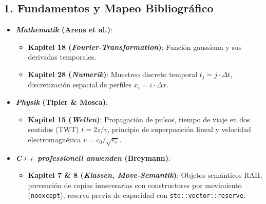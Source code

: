\documentclass[11pt,a4paper]{article}
\begin{document}
\subsection{1. Fundamentos y Mapeo Bibliográfico}
\begin{itemize}
    \item \textbf{\textit{Mathematik} (Arens et al.)}:
    \begin{itemize}
        \item \textbf{Kapitel 18 (\textit{Fourier-Transformation})}: Función gaussiana y sus derivadas temporales.
        \item \textbf{Kapitel 28 (\textit{Numerik})}: Muestreo discreto temporal $t_j = j \cdot \Delta t$, discretización espacial de perfiles $x_i = i \cdot \Delta x$.
    \end{itemize}
    \item \textbf{\textit{Physik} (Tipler \& Mosca)}:
    \begin{itemize}
        \item \textbf{Kapitel 15 (\textit{Wellen})}: Propagación de pulsos, tiempo de viaje en dos sentidos (TWT) $t = 2z/v$, principio de superposición lineal y velocidad electromagnética $v = c_0 / \sqrt{\varepsilon_r}$.
    \end{itemize}
    \item \textbf{\textit{C++ professionell anwenden} (Breymann)}:
    \begin{itemize}
        \item \textbf{Kapitel 7 \& 8 (\textit{Klassen, Move-Semantik})}: Objetos semánticos RAII, prevención de copias innecesarias con constructores por movimiento (\texttt{noexcept}), reserva previa de capacidad con \texttt{std::vector::reserve}.
    \end{itemize}
\end{itemize}
\end{document}
